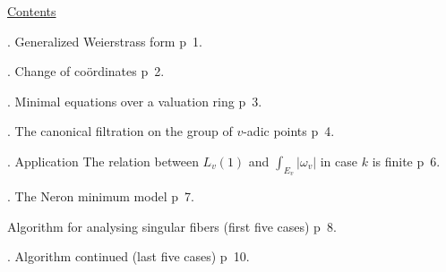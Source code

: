 \begin{center}\uline{Contents}\end{center}

. Generalized Weierstrass form \qquad p~1.

. Change of coördinates \qquad p~2.

. Minimal  equations over a valuation ring \qquad p~3.

. The canonical filtration on the group of $v$-adic points \qquad p~4.

. Application The relation between $L_v(1)$ and $\int_{E_v}|\omega_v|$ in case $k$ is finite \qquad p~6.

. The Neron minimum model \qquad p~7.

 Algorithm for analysing singular fibers \quad (first five cases) \qquad p~8.

. Algorithm continued \quad (last five cases) \qquad p~10.

